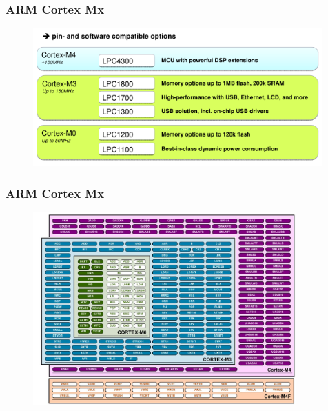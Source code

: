 \documentclass{beamer}
\begin{document}
\begin{frame} 
\frametitle{ARM Cortex Mx}
\begin{figure}[h] \begin{center}
\includegraphics[width=0.99\textwidth]{figures/arm-cortex.png}
\end{center} \end{figure}
\end{frame}

\begin{frame} 
\frametitle{ARM Cortex Mx}
\begin{figure}[h] \begin{center}
\includegraphics[width=0.9\textwidth]{figures/arm-instr.jpeg}
\end{center} \end{figure}
\end{frame}
\end{document}
